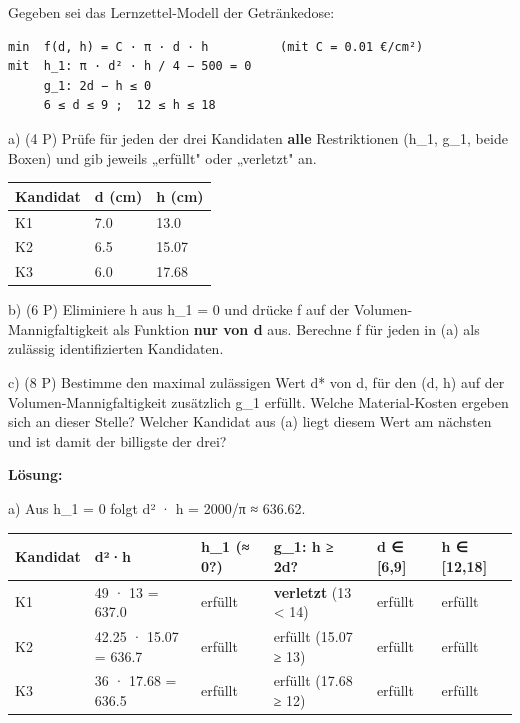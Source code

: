 \documentclass[11pt, a4paper]{article}
\begin{document}
Gegeben sei das Lernzettel-Modell der Getränkedose:


\begin{lstlisting}
min  f(d, h) = C · π · d · h          (mit C = 0.01 €/cm²)
mit  h_1: π · d² · h / 4 − 500 = 0
     g_1: 2d − h ≤ 0
     6 ≤ d ≤ 9 ;  12 ≤ h ≤ 18
\end{lstlisting}


a) (4 P) Prüfe für jeden der drei Kandidaten \textbf{alle} Restriktionen (h\_1, g\_1, beide Boxen) und gib jeweils „erfüllt" oder „verletzt" an.



{\small
\begin{tabularx}{\linewidth}{XXX}
\hline
\rowcolor{tableheadbg}
{\color{white}\textbf{Kandidat}} & {\color{white}\textbf{d (cm)}} & {\color{white}\textbf{h (cm)}} \\[2pt]
\hline
\endhead
\hline
\endfoot
K1 & 7.0 & 13.0 \\
K2 & 6.5 & 15.07 \\
K3 & 6.0 & 17.68 \\
\end{tabularx}
}


b) (6 P) Eliminiere h aus h\_1 = 0 und drücke f auf der Volumen-Mannigfaltigkeit als Funktion \textbf{nur von d} aus. Berechne f für jeden in (a) als zulässig identifizierten Kandidaten.


c) (8 P) Bestimme den maximal zulässigen Wert d* von d, für den (d, h) auf der Volumen-Mannigfaltigkeit zusätzlich g\_1 erfüllt. Welche Material-Kosten ergeben sich an dieser Stelle? Welcher Kandidat aus (a) liegt diesem Wert am nächsten und ist damit der billigste der drei?


\textbf{Lösung:}


a) Aus h\_1 = 0 folgt d² · h = 2000/π ≈ 636.62.



{\small
\begin{tabularx}{\linewidth}{XXXXXX}
\hline
\rowcolor{tableheadbg}
{\color{white}\textbf{Kandidat}} & {\color{white}\textbf{d²·h}} & {\color{white}\textbf{h\_1 (≈ 0?)}} & {\color{white}\textbf{g\_1: h ≥ 2d?}} & {\color{white}\textbf{d ∈ [6,9]}} & {\color{white}\textbf{h ∈ [12,18]}} \\[2pt]
\hline
\endhead
\hline
\endfoot
K1 & 49 · 13 = 637.0 & erfüllt & \textbf{verletzt} (13 < 14) & erfüllt & erfüllt \\
K2 & 42.25 · 15.07 = 636.7 & erfüllt & erfüllt (15.07 ≥ 13) & erfüllt & erfüllt \\
K3 & 36 · 17.68 = 636.5 & erfüllt & erfüllt (17.68 ≥ 12) & erfüllt & erfüllt \\
\end{tabularx}
}
\end{document}
